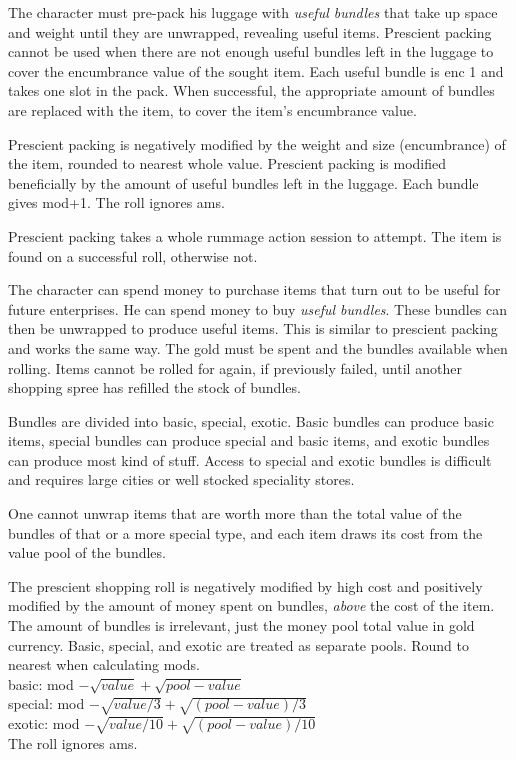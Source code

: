 The character must pre-pack his luggage with \emph{useful bundles} that take up space and weight until they are unwrapped, revealing useful items. Prescient packing cannot be used when there are not enough useful bundles left in the luggage to cover the encumbrance value of the sought item.
Each useful bundle is enc 1 and takes one slot in the pack. When successful, the appropriate amount of bundles are replaced with the item, to cover the item's encumbrance value.

Prescient packing is negatively modified by the weight and size (encumbrance) of the item, rounded to nearest whole value.
Prescient packing is modified beneficially by the amount of useful bundles left in the luggage. Each bundle gives mod+1.
The roll ignores ams.

Prescient packing takes a whole rummage action session to attempt. The item is found on a successful roll, otherwise not.


 The character can spend money to purchase items that turn out to be useful for future enterprises. He can spend money to buy \emph{useful bundles}. These bundles can then be unwrapped to produce useful items. This is similar to prescient packing and works the same way.
The gold must be spent and the bundles available when rolling. Items cannot be rolled for again, if previously failed, until another shopping spree has refilled the stock of bundles.

Bundles are divided into basic, special, exotic. Basic bundles can produce basic items, special bundles can produce special and basic items, and exotic bundles can produce most kind of stuff. Access to special and exotic bundles is difficult and requires large cities or well stocked speciality stores.

One cannot unwrap items that are worth more than the total value of the bundles of that or a more special type, and each item draws its cost from the value pool of the bundles.

The prescient shopping roll is negatively modified by high cost and positively modified by the amount of money spent on bundles, \emph{above} the cost of the item. The amount of bundles is irrelevant, just the money pool total value in gold currency. Basic, special, and exotic are treated as separate pools. Round to nearest when calculating mods.\\
basic: mod $- \sqrt{value} + \sqrt{pool-value}$\\
special: mod $- \sqrt{value/3} + \sqrt{(pool-value)/3}$\\
exotic: mod $- \sqrt{value/10} + \sqrt{(pool-value)/10}$\\
The roll ignores ams.

